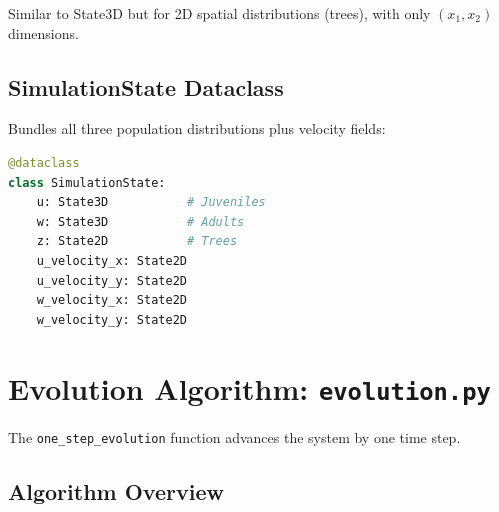 \documentclass[12pt,a4paper]{report}
\begin{document}
Similar to State3D but for 2D spatial distributions (trees), with only $(x_1, x_2)$ dimensions.

\subsection{SimulationState Dataclass}

Bundles all three population distributions plus velocity fields:

\begin{lstlisting}[language=Python]
@dataclass
class SimulationState:
    u: State3D           # Juveniles
    w: State3D           # Adults
    z: State2D           # Trees
    u_velocity_x: State2D
    u_velocity_y: State2D
    w_velocity_x: State2D
    w_velocity_y: State2D
\end{lstlisting}

\section{Evolution Algorithm: \texttt{evolution.py}}

The \texttt{one\_step\_evolution} function advances the system by one time step.

\subsection{Algorithm Overview}
\end{document}
